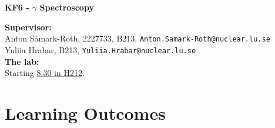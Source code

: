\documentclass[12pt]{article}
\begin{document}
\begin{center} {\Large\bf\boldmath KF6 - $\gamma$ Spectroscopy}\\
\end{center}

{\bf Supervisor:}\\
Anton S\r{a}mark-Roth,     2227733, B213, \texttt{Anton.Samark-Roth@nuclear.lu.se}\\
Yuliia Hrabar, B213, \texttt{Yuliia.Hrabar@nuclear.lu.se}\\

{\bf The lab:}\\
Starting \underline{8.30 in H212}.
\\

\section*{Learning Outcomes}
\end{document}
